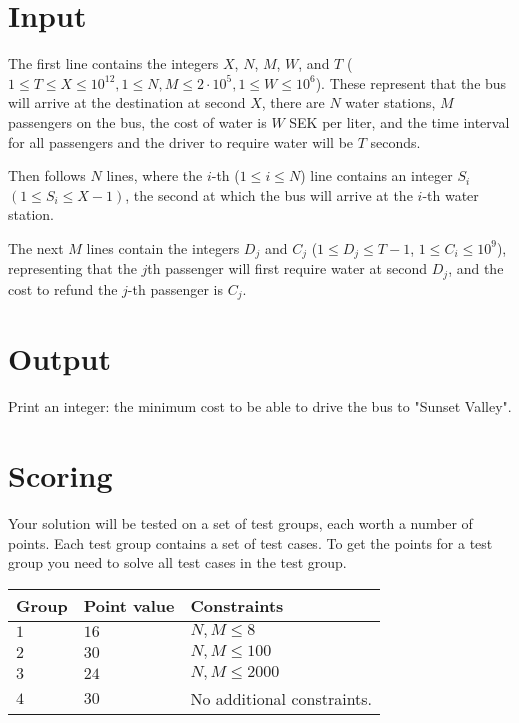\section*{Input}
\noindent
The first line contains the integers $X$, $N$, $M$, $W$, and $T$ 
($1 \leq T \leq X \leq 10^{12}, 1 \leq N,M \leq 2\cdot 10^5, 1 \leq W \leq 10^6$). 
These represent that the bus will arrive at the destination at second $X$, there are $N$ water stations, 
$M$ passengers on the bus, the cost of water is $W$ SEK per liter, and the time interval 
for all passengers and the driver to require water will be $T$ seconds.

Then follows $N$ lines, where the $i$-th ($1 \leq i \leq N$) line contains an integer $S_i$ $(1 \leq S_i \leq X-1)$, 
the second at which the bus will arrive at the $i$-th water station.

The next $M$ lines contain the integers $D_j$ and $C_j$ ($1 \leq D_j \leq T-1$, $1 \leq C_i \leq 10^9$), 
representing that the $j$th passenger will first require water at second $D_j$, and the cost to refund the $j$-th passenger is $C_j$.

\section*{Output}
\noindent
Print an integer: the minimum cost to be able to drive the bus to "Sunset Valley".

\section*{Scoring}
Your solution will be tested on a set of test groups, each worth a number of points. 
Each test group contains a set of test cases. 
To get the points for a test group you need to solve all test cases in the test group.

\noindent
\begin{tabular}{| l | l | p{12cm} |}
  \hline
  \textbf{Group} & \textbf{Point value} & \textbf{Constraints} \\ \hline
  $1$    & $16$         & $N,M \leq 8$  \\ \hline
  $2$    & $30$         & $N,M \leq 100$ \\ \hline
  $3$    & $24$         & $N,M \leq 2000$ \\ \hline
  $4$    & $30$         & No additional constraints. \\ \hline
\end{tabular}



